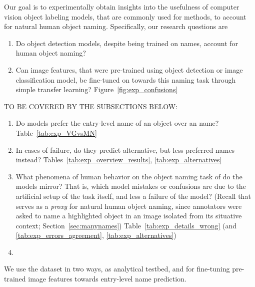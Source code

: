 

Our goal is to experimentally obtain insights into the usefulness of computer vision object labeling models, that are commonly used for \lv methods, to account for natural human object naming. 
Specifically, our research questions are
\begin{enumerate}
	\item Do object detection models, despite being trained on \arbitrary  
	names, account for human object naming?
	\item Can image features, that were pre-trained using object detection or image classification model, be fine-tuned on \mn towards this naming task through simple transfer learning? Figure~\ref{fig:exp_confusions} \\
\end{enumerate}
TO BE COVERED BY THE SUBSECTIONS BELOW:
\begin{enumerate}
	\item Do models prefer the entry-level name of an object over an  name? Table~\ref{tab:exp_VGvsMN}
	\item In cases of failure, do they predict alternative, but less preferred  names instead? Tables~\ref{tab:exp_overview_results}, \ref{tab:exp_alternatives}
	\item What phenomena of human behavior on the object naming task of \mn do the models mirror? That is, which model mistakes or confusions are due to the artificial setup of the task itself, and less a failure of the model? (Recall that \mn serves as a \textit{proxy} for natural human object naming, since annotators were asked to name a highlighted object in an image isolated from its situative context; Section~\ref{sec:manynames}) Table~\ref{tab:exp_details_wrong} (and \ref{tab:exp_errors_agreement},  \ref{tab:exp_alternatives})
	
	\item {}
\end{enumerate}
We use the \mn dataset in two ways, as analytical testbed, and for fine-tuning pre-trained image features towards entry-level name prediction.


